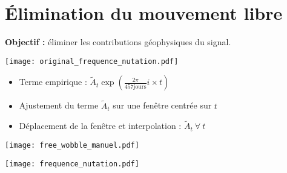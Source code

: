 \section{Élimination du mouvement libre}
\begin{frame}
  	\textbf{Objectif :} éliminer les contributions géophysiques du signal.
  	\centerline{\texttt{[image: original\_frequence\_nutation.pdf]}}
\end{frame}

\begin{frame}
  \begin{itemize}
    \item Terme empirique : $ \tilde{A}_t \exp\left( \frac{2\pi }{457 \mbox{jours}}i \times t  \right) $
    \item Ajustement du terme $ \tilde{A}_t $ sur une fenêtre centrée sur $t$ 
    \item Déplacement de la fenêtre et interpolation : $ \tilde{A}_t\ \forall\ t $
  \end{itemize}

  \centerline{\texttt{[image: free\_wobble\_manuel.pdf]}}
\end{frame}


\begin{frame}
  \texttt{[image: frequence\_nutation.pdf]}
\end{frame}

